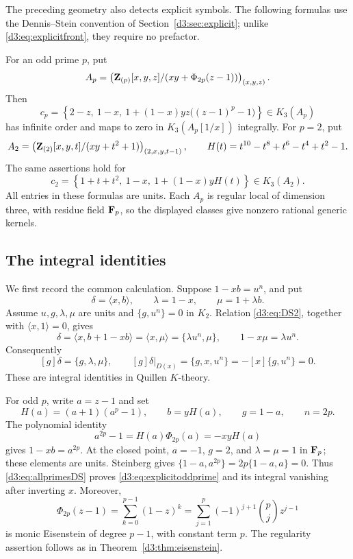 The preceding geometry also detects explicit symbols. The following formulas use the Dennis--Stein convention of Section~\ref{d3:sec:explicit}; unlike \eqref{d3:eq:explicitfront}, they require no prefactor.

\begin{theorem}\label{d3:thm:explicitallprimes}
For an odd prime $p$, put
\[
 A_p=\left(\mathbf Z_{(p)}[x,y,z]/(xy+\Phi_{2p}(z-1))\right)_{(x,y,z)}.
\]
Then
\begin{equation}\label{d3:eq:explicitoddprime}
 c_p=\left\{2-z,\ 1-x,\
 1+(1-x)yz\bigl((z-1)^p-1\bigr)\right\}\in K_3(A_p)
\end{equation}
has infinite order and maps to zero in $K_3(A_p[1/x])$ integrally.
For $p=2$, put
\[
 A_2=\left(\mathbf Z_{(2)}[x,y,t]/(xy+t^2+1)\right)_{(2,x,y,t-1)},
 \qquad H(t)=t^{10}-t^8+t^6-t^4+t^2-1.
\]
The same assertions hold for
\begin{equation}\label{d3:eq:explicittwoprime}
 c_2=\left\{1+t+t^2,\ 1-x,\ 1+(1-x)yH(t)\right\}\in K_3(A_2).
\end{equation}
All entries in these formulas are units. Each $A_p$ is regular local of dimension three, with residue field $\mathbf F_p$, so the displayed classes give nonzero rational generic kernels.
\end{theorem}

\subsection{The integral identities}

We first record the common calculation. Suppose $1-xb=u^n$, and put
\[
 \delta=\langle x,b\rangle,\qquad \lambda=1-x,\qquad
 \mu=1+\lambda b.
\]
Assume $u,g,\lambda,\mu$ are units and $\{g,u^n\}=0$ in $K_2$.
Relation \eqref{d3:eq:DS2}, together with $\langle x,1\rangle=0$, gives
\[
 \delta=\langle x,b+1-xb\rangle=\langle x,\mu\rangle
       =\{\lambda u^n,\mu\},
 \qquad 1-x\mu=\lambda u^n.
\]
Consequently
\begin{equation}\label{d3:eq:allprimesDS}
 [g]\delta=\{g,\lambda,\mu\},\qquad
 [g]\delta|_{D(x)}=\{g,x,u^n\}=-[x]\{g,u^n\}=0.
\end{equation}
These are integral identities in Quillen $K$-theory.

For odd $p$, write $a=z-1$ and set
\[
 H(a)=(a+1)(a^p-1),\qquad b=yH(a),\qquad g=1-a,\qquad n=2p.
\]
The polynomial identity
\[
 a^{2p}-1=H(a)\Phi_{2p}(a)=-xyH(a)
\]
gives $1-xb=a^{2p}$. At the closed point,
$a=-1$, $g=2$, and $\lambda=\mu=1$ in $\mathbf F_p$; these elements are units.
Steinberg gives $\{1-a,a^{2p}\}=2p\{1-a,a\}=0$.
Thus \eqref{d3:eq:allprimesDS} proves \eqref{d3:eq:explicitoddprime} and its integral vanishing after inverting $x$.
Moreover,
\[
 \Phi_{2p}(z-1)
 =\sum_{k=0}^{p-1}(1-z)^k
 =\sum_{j=1}^{p}(-1)^{j+1}\binom pj z^{j-1}
\]
is monic Eisenstein of degree $p-1$, with constant term $p$. The regularity assertion follows as in Theorem~\ref{d3:thm:eisenstein}.

